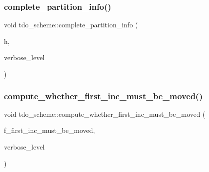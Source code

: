 \subsubsection{\texorpdfstring{complete\+\_\+partition\+\_\+info()}{complete\_partition\_info()}}
{\footnotesize\ttfamily void tdo\+\_\+scheme\+::complete\+\_\+partition\+\_\+info (\begin{DoxyParamCaption}\item[{\mbox{\hyperlink{galois_8h_a09fddde158a3a20bd2dcadb609de11dc}{I\+NT}}}]{h,  }\item[{\mbox{\hyperlink{galois_8h_a09fddde158a3a20bd2dcadb609de11dc}{I\+NT}}}]{verbose\+\_\+level }\end{DoxyParamCaption})}

\mbox{\label{classtdo__scheme_aca3f66823aee8b4df943eac2cd8800b3}} 
\subsubsection{\texorpdfstring{compute\+\_\+whether\+\_\+first\+\_\+inc\+\_\+must\+\_\+be\+\_\+moved()}{compute\_whether\_first\_inc\_must\_be\_moved()}}
{\footnotesize\ttfamily void tdo\+\_\+scheme\+::compute\+\_\+whether\+\_\+first\+\_\+inc\+\_\+must\+\_\+be\+\_\+moved (\begin{DoxyParamCaption}\item[{\mbox{\hyperlink{galois_8h_a09fddde158a3a20bd2dcadb609de11dc}{I\+NT}} $\ast$}]{f\+\_\+first\+\_\+inc\+\_\+must\+\_\+be\+\_\+moved,  }\item[{\mbox{\hyperlink{galois_8h_a09fddde158a3a20bd2dcadb609de11dc}{I\+NT}}}]{verbose\+\_\+level }\end{DoxyParamCaption})}

\mbox{\label{classtdo__scheme_a63bf0fdcfae0e210e0e5f03a91d4072b}} 
